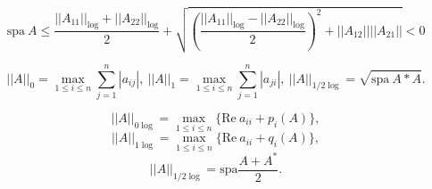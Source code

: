 \documentclass{article}
\begin{document}
$$
    \mbox{spa}~A
    \leq \frac{||A_{11}||_{\log}+||A_{22}||_{\log}}{2}+
    \sqrt{\left(\frac{||A_{11}||_{\log}-||A_{22}||_{\log}}{2}\right)^2+||A_{12}||||A_{21}||} < 0
$$

$$
    ||A||_0=\max\limits_{1\leq i \leq n}\sum\limits_{j=1}^n|a_{ij}|,~
    ||A||_1=\max\limits_{1\leq i \leq n}\sum\limits_{j=1}^n|a_{ji}|,~
    ||A||_{1/2 \log}=\sqrt{\mbox{spa}~A\ast A}.
$$

$$||A||_{0\log}=\max\limits_{1\leq i \leq n}\{\mbox{Re}~a_{ii}+p_i(A)\},$$
$$||A||_{1\log}=\max\limits_{1\leq i \leq n}\{\mbox{Re}~a_{ii}+q_i(A)\},$$
$$||A||_{1/2\log}=\mbox{spa}\frac{A+A^\ast}{2}.$$
\end{document}
